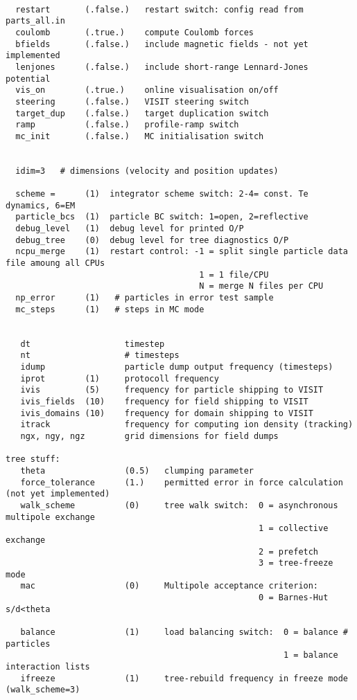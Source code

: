 \documentclass[11pt,psfig]{article}
\begin{document}
\begin{verbatim}

  restart       (.false.)   restart switch: config read from parts_all.in
  coulomb       (.true.)    compute Coulomb forces
  bfields       (.false.)   include magnetic fields - not yet implemented
  lenjones      (.false.)   include short-range Lennard-Jones potential
  vis_on        (.true.)    online visualisation on/off
  steering      (.false.)   VISIT steering switch
  target_dup    (.false.)   target duplication switch
  ramp          (.false.)   profile-ramp switch
  mc_init       (.false.)   MC initialisation switch


  idim=3   # dimensions (velocity and position updates)

  scheme =      (1)  integrator scheme switch: 2-4= const. Te dynamics, 6=EM
  particle_bcs  (1)  particle BC switch: 1=open, 2=reflective
  debug_level   (1)  debug level for printed O/P
  debug_tree    (0)  debug level for tree diagnostics O/P
  ncpu_merge    (1)  restart control: -1 = split single particle data file amoung all CPUs
                                       1 = 1 file/CPU
                                       N = merge N files per CPU
  np_error      (1)   # particles in error test sample
  mc_steps      (1)   # steps in MC mode


   dt                   timestep
   nt                   # timesteps 
   idump                particle dump output frequency (timesteps)
   iprot        (1)     protocoll frequency
   ivis         (5)     frequency for particle shipping to VISIT
   ivis_fields  (10)    frequency for field shipping to VISIT
   ivis_domains (10)    frequency for domain shipping to VISIT
   itrack               frequency for computing ion density (tracking)
   ngx, ngy, ngz        grid dimensions for field dumps

tree stuff:
   theta                (0.5)   clumping parameter
   force_tolerance      (1.)    permitted error in force calculation (not yet implemented)
   walk_scheme          (0)     tree walk switch:  0 = asynchronous multipole exchange
                                                   1 = collective exchange
                                                   2 = prefetch
                                                   3 = tree-freeze mode
   mac                  (0)     Multipole acceptance criterion:
                                                   0 = Barnes-Hut s/d<theta

   balance              (1)     load balancing switch:  0 = balance # particles
                                                        1 = balance interaction lists
   ifreeze              (1)     tree-rebuild frequency in freeze mode (walk_scheme=3)


\end{verbatim}
\end{document}
